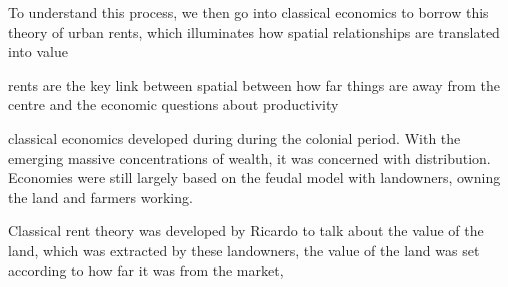 \documentclass[]{article}
\begin{document}
To understand this process, we then  go into classical economics to borrow this theory of urban rents, which illuminates how  spatial relationships are translated into value 

rents are the key link between spatial between how far things are away from the centre and the economic questions about productivity %




classical economics developed during during the colonial period. With the emerging massive concentrations of wealth, it was %
concerned with distribution. Economies were still largely based on the feudal model with landowners, owning the land and farmers working.

Classical rent theory was developed by Ricardo to talk about the value of the land, which was extracted by these landowners,%
the value of the land was set according to how far it was from the market, %
\end{document}
